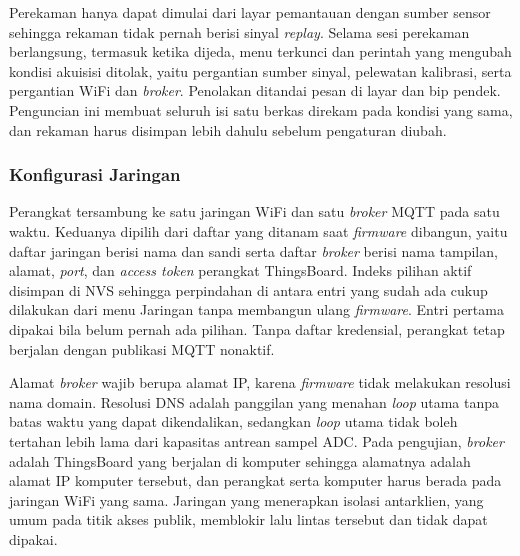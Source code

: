 Perekaman hanya dapat dimulai dari layar pemantauan dengan sumber sensor sehingga rekaman tidak pernah berisi sinyal \textit{replay}. Selama sesi perekaman berlangsung, termasuk ketika dijeda, menu terkunci dan perintah yang mengubah kondisi akuisisi ditolak, yaitu pergantian sumber sinyal, pelewatan kalibrasi, serta pergantian WiFi dan \textit{broker}. Penolakan ditandai pesan di layar dan bip pendek. Penguncian ini membuat seluruh isi satu berkas direkam pada kondisi yang sama, dan rekaman harus disimpan lebih dahulu sebelum pengaturan diubah.

\subsubsection{Konfigurasi Jaringan}

Perangkat tersambung ke satu jaringan WiFi dan satu \textit{broker} MQTT pada satu waktu. Keduanya dipilih dari daftar yang ditanam saat \textit{firmware} dibangun, yaitu daftar jaringan berisi nama dan sandi serta daftar \textit{broker} berisi nama tampilan, alamat, \textit{port}, dan \textit{access token} perangkat ThingsBoard. Indeks pilihan aktif disimpan di NVS sehingga perpindahan di antara entri yang sudah ada cukup dilakukan dari menu Jaringan tanpa membangun ulang \textit{firmware}. Entri pertama dipakai bila belum pernah ada pilihan. Tanpa daftar kredensial, perangkat tetap berjalan dengan publikasi MQTT nonaktif.

Alamat \textit{broker} wajib berupa alamat IP, karena \textit{firmware} tidak melakukan resolusi nama domain. Resolusi DNS adalah panggilan yang menahan \textit{loop} utama tanpa batas waktu yang dapat dikendalikan, sedangkan \textit{loop} utama tidak boleh tertahan lebih lama dari kapasitas antrean sampel ADC. Pada pengujian, \textit{broker} adalah ThingsBoard yang berjalan di komputer sehingga alamatnya adalah alamat IP komputer tersebut, dan perangkat serta komputer harus berada pada jaringan WiFi yang sama. Jaringan yang menerapkan isolasi antarklien, yang umum pada titik akses publik, memblokir lalu lintas tersebut dan tidak dapat dipakai.

